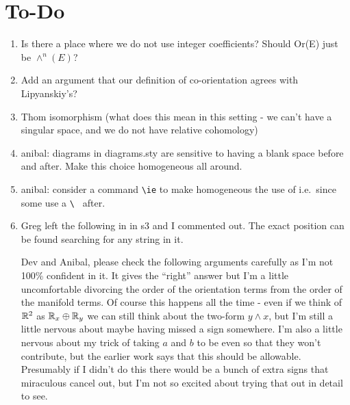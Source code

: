 
\section*{To-Do}
\begin{enumerate}
	\item Is there a place where we do not use integer coefficients? Should Or(E) just be $\wedge^n(E)$?

	\item Add an argument that our definition of co-orientation agrees with Lipyanskiy's?

	\item Thom isomorphism (what does this mean in this setting - we can't have a singular space, and we do not have relative cohomology)

	\item anibal: diagrams in diagrams.sty are sensitive to having a blank space before and after.
	Make this choice homogeneous all around.

	\item anibal: consider a command \verb|\ie| to make homogeneous the use of i.e.\ since some use a \verb|\ | after.

	\item Greg left the following in in s3 and I commented out.
	The exact position can be found searching for any string in it.

	Dev and Anibal, please check the following arguments carefully as I'm not 100\% confident in it.
	It gives the ``right'' answer but I'm a little uncomfortable divorcing the order of the orientation terms from the order of the manifold terms.
	Of course this happens all the time - even if we think of $\mathbb{R}^2$ as $\mathbb{R}_x \oplus \mathbb{R}_y$ we can still think about the two-form $y \wedge x$, but I'm still a little nervous about maybe having missed a sign somewhere.
	I'm also a little nervous about my trick of taking $a$ and $b$ to be even so that they won't contribute, but the earlier work says that this should be allowable.
	Presumably if I didn't do this there would be a bunch of extra signs that miraculous cancel out, but I'm not so excited about trying that out in detail to see.

\begin{comment}
	\item \sout{Picture for creasing.}
	\item Compactness and orientation assumptions on Theorem 3.13 (transversality constrains preserve q-iso type).


\end{comment}
\end{enumerate}
